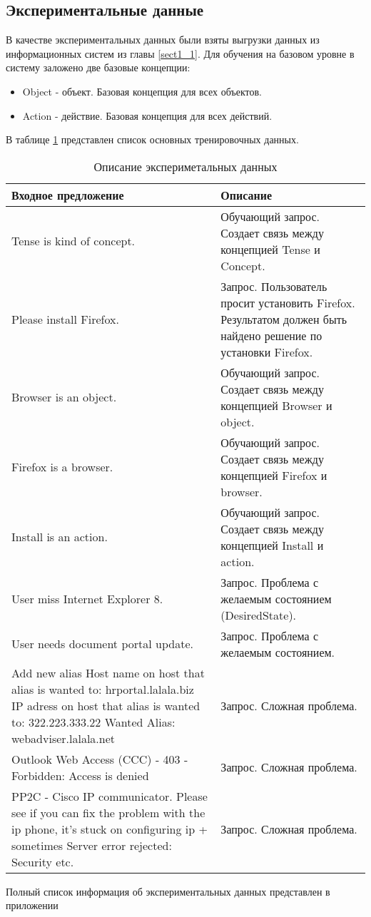 \subsection{Экспериментальные данные}
В качестве экспериментальных данных были взяты выгрузки данных из информационных систем из главы \ref{sect1_1}. 
Для обучения на базовом уровне в систему заложено две базовые концепции: 
\begin{itemize}
	\item Object - объект. Базовая концепция для всех объектов.
	\item Action - действие. Базовая концепция для всех действий.
\end{itemize} 
В таблице \ref{Test data description} представлен список основных тренировочных данных.
\begin{table} [htbp]
   \centering
   \parbox{15cm}{\caption{Описание экспериметальных данных}\label{Test data description}}
  \begin{tabular}{| p{12cm} ||p{5cm} |}
  \hline
  \hline
Входное предложение & Описание \\
  \hline
  Tense is kind of concept. & Обучающий запрос. Создает связь между концепцией Tense и Concept. \\
  
  \hline
  Please install Firefox.  & Запрос. Пользователь просит установить Firefox. Результатом должен быть найдено решение по установки Firefox. \\
  \hline
  Browser is an object.   & Обучающий запрос. Создает связь между концепцией Browser и object. \\
  \hline
  Firefox is a browser.   & Обучающий запрос. Создает связь между концепцией Firefox и browser.  \\
  \hline
  Install is an action.    & Обучающий запрос. Создает связь между концепцией Install и action. \\
  \hline
  User miss Internet Explorer 8.     & Запрос. Проблема с желаемым состоянием (DesiredState). \\
  \hline
  User needs document portal update.    & Запрос. Проблема с желаемым состоянием. \\
  \hline
  Add new alias Host name on host that alias is wanted to: hrportal.lalala.biz IP adress on host that alias is wanted to: 322.223.333.22 Wanted Alias:    webadviser.lalala.net    & Запрос. Сложная проблема.  \\ 
  \hline
  Outlook Web Access (CCC) - 403 - Forbidden: Access is denied & Запрос. Сложная проблема. \\ 
  \hline
  PP2C - Cisco IP communicator. Please see if you can fix the problem with the ip phone, it's stuck on configuring ip + sometimes Server error rejected: Security etc.     & Запрос. Сложная проблема. \\ 
    \hline
  \hline
\end{tabular}
Полный список информация об экспериментальных данных представлен в приложении  
\end{table}
